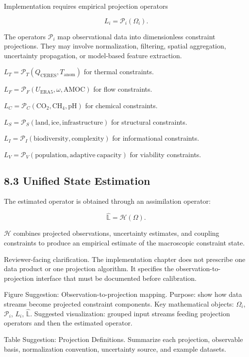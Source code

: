 \documentclass[aps,pre,reprint,superscriptaddress,nofootinbib]{revtex4-2}
\begin{document}
Implementation requires empirical projection operators

\[ L_i=\mathcal{P}_i(\Omega_i). \]

The operators \(\mathcal{P}_i\) map observational data into dimensionless constraint projections. They may involve normalization, filtering, spatial aggregation, uncertainty propagation, or model-based feature extraction.

\(L_T=\mathcal{P}_T(Q_{\mathrm{CERES}},T_{\mathrm{anom}})\) for thermal constraints.

\(L_F=\mathcal{P}_F(U_{\mathrm{ERA5}},\omega,\mathrm{AMOC})\) for flow constraints.

\(L_C=\mathcal{P}_C(\mathrm{CO}_2,\mathrm{CH}_4,\mathrm{pH})\) for chemical constraints.

\(L_S=\mathcal{P}_S(\mathrm{land},\mathrm{ice},\mathrm{infrastructure})\) for structural constraints.

\(L_I=\mathcal{P}_I(\mathrm{biodiversity},\mathrm{complexity})\) for informational constraints.

\(L_V=\mathcal{P}_V(\mathrm{population},\mathrm{adaptive\ capacity})\) for viability constraints.

\subsection{8.3 Unified State Estimation}

The estimated operator is obtained through an assimilation operator:

\[ \hat{\mathbb{L}}=\mathcal{H}(\Omega). \]

\(\mathcal{H}\) combines projected observations, uncertainty estimates, and coupling constraints to produce an empirical estimate of the macroscopic constraint state.

Reviewer-facing clarification. The implementation chapter does not prescribe one data product or one projection algorithm. It specifies the observation-to-projection interface that must be documented before calibration.

Figure Suggestion: Observation-to-projection mapping. Purpose: show how data streams become projected constraint components. Key mathematical objects: \(\Omega_i\), \(\mathcal{P}_i\), \(L_i\), \(\hat{\mathbb{L}}\). Suggested visualization: grouped input streams feeding projection operators and then the estimated operator.

Table Suggestion: Projection Definitions. Summarize each projection, observable basis, normalization convention, uncertainty source, and example datasets.
\end{document}
